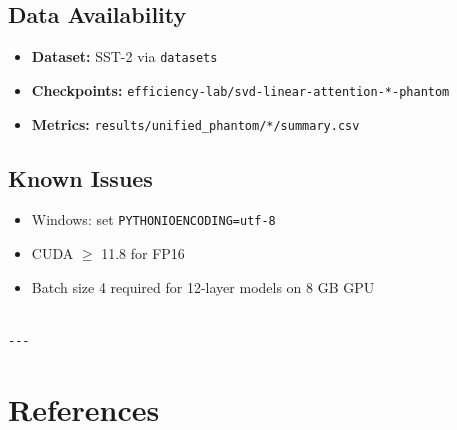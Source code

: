 \subsection{Data Availability}

\begin{itemize}
\item \textbf{Dataset:} SST-2 via \texttt{datasets}
\item \textbf{Checkpoints:} \texttt{efficiency-lab/svd-linear-attention-*-phantom}
\item \textbf{Metrics:} \texttt{results/unified\_phantom/*/summary.csv}

\end{itemize}
\subsection{Known Issues}

\begin{itemize}
\item Windows: set \texttt{PYTHONIOENCODING=utf-8}
\item CUDA $\ge$ 11.8 for FP16
\item Batch size 4 required for 12-layer models on 8 GB GPU
\end{itemize}
\begin{lstlisting}

---
\end{lstlisting}


\section{References}

